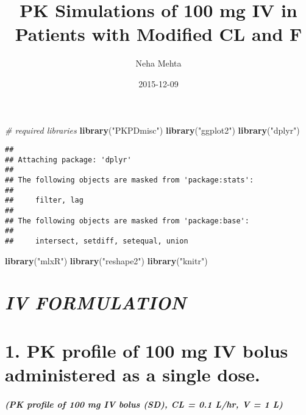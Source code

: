 \documentclass[]{article}
\title{PK Simulations of 100 mg IV in Patients with Modified CL and F}
\author{Neha Mehta}
\date{2015-12-09}
\newenvironment{Shaded}{\begin{snugshade}}{\end{snugshade}}
\newcommand{\KeywordTok}[1]{\textcolor[rgb]{0.13,0.29,0.53}{\textbf{{#1}}}}
\newcommand{\DataTypeTok}[1]{\textcolor[rgb]{0.13,0.29,0.53}{{#1}}}
\newcommand{\StringTok}[1]{\textcolor[rgb]{0.31,0.60,0.02}{{#1}}}
\newcommand{\CommentTok}[1]{\textcolor[rgb]{0.56,0.35,0.01}{\textit{{#1}}}}
\newcommand{\OtherTok}[1]{\textcolor[rgb]{0.56,0.35,0.01}{{#1}}}
\newcommand{\NormalTok}[1]{{#1}}
\begin{document}
\maketitle


\begin{Shaded}
\begin{Highlighting}[]
\CommentTok{# required libraries}
\KeywordTok{library}\NormalTok{(}\StringTok{"PKPDmisc"}\NormalTok{)}
\KeywordTok{library}\NormalTok{(}\StringTok{"ggplot2"}\NormalTok{)}
\KeywordTok{library}\NormalTok{(}\StringTok{"dplyr"}\NormalTok{)}
\end{Highlighting}
\end{Shaded}

\begin{verbatim}
## 
## Attaching package: 'dplyr'
## 
## The following objects are masked from 'package:stats':
## 
##     filter, lag
## 
## The following objects are masked from 'package:base':
## 
##     intersect, setdiff, setequal, union
\end{verbatim}

\begin{Shaded}
\begin{Highlighting}[]
\KeywordTok{library}\NormalTok{(}\StringTok{"mlxR"}\NormalTok{)}
\KeywordTok{library}\NormalTok{(}\StringTok{"reshape2"}\NormalTok{)}
\KeywordTok{library}\NormalTok{(}\StringTok{"knitr"}\NormalTok{)}
\end{Highlighting}
\end{Shaded}

\begin{Shaded}
\end{Shaded}

\section{\emph{IV FORMULATION}}\label{iv-formulation}

\section{1. PK profile of 100 mg IV bolus administered as a single
dose.}\label{pk-profile-of-100-mg-iv-bolus-administered-as-a-single-dose.}

\subparagraph{(PK profile of 100 mg IV bolus (SD), CL = 0.1 L/hr, V = 1
L)}\label{pk-profile-of-100-mg-iv-bolus-sd-cl-0.1-lhr-v-1-l}
\end{document}
